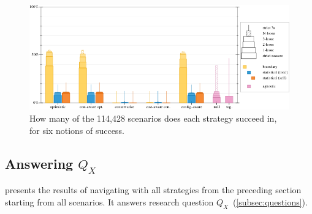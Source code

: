\begin{figure}[t]
  \includegraphics[width=\columnwidth]{data/strategy-overall-feasible.pdf}
  \caption{How many of the 114,428 scenarios does each strategy succeed in, for six notions of success.}
  \label{f:strategy-overall}
\end{figure}

\subsection{Answering $Q_X$} \label{subsec:qx}

 presents the results of navigating with all strategies
from the preceding section starting from all scenarios. It answers
research question $Q_X$~(\cref{subsec:questions}).


